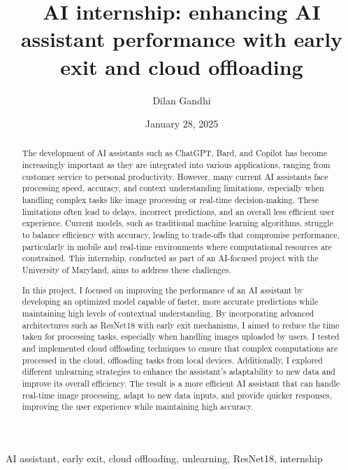 ﻿\documentclass[12pt,conference,onecolumn]{IEEEtran}
\title{AI internship: enhancing AI assistant performance with early exit and cloud offloading}
\author{Dilan Gandhi}
\date{January 28, 2025}
\newcommand{\keywords}{AI assistant, early exit, cloud offloading, unlearning, ResNet18, internship}
\begin{document}
\maketitle 

\begin{abstract}
The development of AI assistants such as ChatGPT, Bard, and Copilot has become increasingly important as they are integrated into various applications, ranging from customer service to personal productivity. However, many current AI assistants face processing speed, accuracy, and context understanding limitations, especially when handling complex tasks like image processing or real-time decision-making. These limitations often lead to delays, incorrect predictions, and an overall less efficient user experience. Current models, such as traditional machine learning algorithms, struggle to balance efficiency with accuracy, leading to trade-offs that compromise performance, particularly in mobile and real-time environments where computational resources are constrained. This internship, conducted as part of an AI-focused project with the University of Maryland, aims to address these challenges.

In this project, I focused on improving the performance of an AI assistant by developing an optimized model capable of faster, more accurate predictions while maintaining high levels of contextual understanding. By incorporating advanced architectures such as ResNet18 with early exit mechanisms, I aimed to reduce the time taken for processing tasks, especially when handling images uploaded by users. I tested and implemented cloud offloading techniques to ensure that complex computations are processed in the cloud, offloading tasks from local devices. Additionally, I explored different unlearning strategies to enhance the assistant's adaptability to new data and improve its overall efficiency. The result is a more efficient AI assistant that can handle real-time image processing, adapt to new data inputs, and provide quicker responses, improving the user experience while maintaining high accuracy.
\end{abstract}

\begin{IEEEkeywords}
\keywords
\end{IEEEkeywords}
\end{document}
